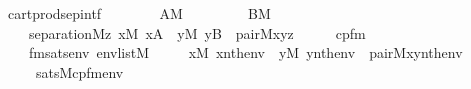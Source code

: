 \begin{isabellebody}
\isamarkupfalse%
\ cartprod{\isacharunderscore}{\kern0pt}sep{\isacharunderscore}{\kern0pt}intf\ {\isacharcolon}{\kern0pt}\isanewline
\ \ \isanewline
\ \ \ \ {\isachardoublequoteopen}A{\isasymin}M{\isachardoublequoteclose}\isanewline
\ \ \ \ \isanewline
\ \ \ \ {\isachardoublequoteopen}B{\isasymin}M{\isachardoublequoteclose}\isanewline
\ \ \isanewline
\ \ \ \ {\isachardoublequoteopen}separation{\isacharparenleft}{\kern0pt}{\isacharhash}{\kern0pt}{\isacharhash}{\kern0pt}M{\isacharcomma}{\kern0pt}{\isasymlambda}z{\isachardot}{\kern0pt}\ {\isasymexists}x{\isasymin}M{\isachardot}{\kern0pt}\ x{\isasymin}A\ {\isasymand}\ {\isacharparenleft}{\kern0pt}{\isasymexists}y{\isasymin}M{\isachardot}{\kern0pt}\ y{\isasymin}B\ {\isasymand}\ pair{\isacharparenleft}{\kern0pt}{\isacharhash}{\kern0pt}{\isacharhash}{\kern0pt}M{\isacharcomma}{\kern0pt}x{\isacharcomma}{\kern0pt}y{\isacharcomma}{\kern0pt}z{\isacharparenright}{\kern0pt}{\isacharparenright}{\kern0pt}{\isacharparenright}{\kern0pt}{\isachardoublequoteclose}\isanewline
%
\isadelimproof
%
\endisadelimproof
%
\isatagproof
{}\isamarkupfalse%
\ {\isacharminus}{\kern0pt}\isanewline
\ \ \isamarkupfalse%
\ cpfm\ \isanewline
\ \ \ \ fmsats{\isacharcolon}{\kern0pt}{\isachardoublequoteopen}{\isasymAnd}env{\isachardot}{\kern0pt}\ env{\isasymin}list{\isacharparenleft}{\kern0pt}M{\isacharparenright}{\kern0pt}\ {\isasymLongrightarrow}\isanewline
\ \ \ \ {\isacharparenleft}{\kern0pt}{\isasymexists}x{\isasymin}M{\isachardot}{\kern0pt}\ x{\isasymin}nth{\isacharparenleft}{\kern0pt}{}{\isacharcomma}{\kern0pt}env{\isacharparenright}{\kern0pt}\ {\isasymand}\ {\isacharparenleft}{\kern0pt}{\isasymexists}y{\isasymin}M{\isachardot}{\kern0pt}\ y{\isasymin}nth{\isacharparenleft}{\kern0pt}{}{\isacharcomma}{\kern0pt}env{\isacharparenright}{\kern0pt}\ {\isasymand}\ pair{\isacharparenleft}{\kern0pt}{\isacharhash}{\kern0pt}{\isacharhash}{\kern0pt}M{\isacharcomma}{\kern0pt}x{\isacharcomma}{\kern0pt}y{\isacharcomma}{\kern0pt}nth{\isacharparenleft}{\kern0pt}{}{\isacharcomma}{\kern0pt}env{\isacharparenright}{\kern0pt}{\isacharparenright}{\kern0pt}{\isacharparenright}{\kern0pt}{\isacharparenright}{\kern0pt}\isanewline
\ \ \ \ {\isasymlongleftrightarrow}\ sats{\isacharparenleft}{\kern0pt}M{\isacharcomma}{\kern0pt}cpfm{\isacharparenleft}{\kern0pt}{}{\isacharcomma}{\kern0pt}{}{\isacharcomma}{\kern0pt}{}{\isacharparenright}{\kern0pt}{\isacharcomma}{\kern0pt}env{\isacharparenright}{\kern0pt}{\isachardoublequoteclose}\isanewline

\end{isabellebody}
